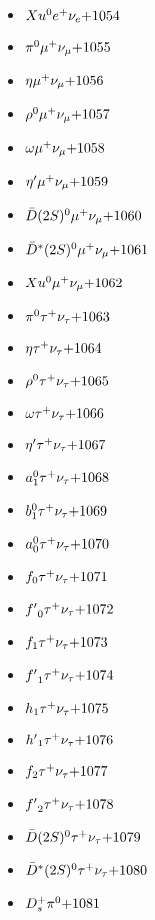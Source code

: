 \begin{multicols}{3}
\begin{itemize}
 \item $ Xu^{0} e^{+} \nu_{e} \hfill{+1054}$
 \item $ \pi^{0} \mu^{+} \nu_{\mu} \hfill{+1055}$
 \item $ \eta \mu^{+} \nu_{\mu} \hfill{+1056}$
 \item $ \rho^{0} \mu^{+} \nu_{\mu} \hfill{+1057}$
 \item $ \omega \mu^{+} \nu_{\mu} \hfill{+1058}$
 \item $ {\eta^{\prime}} \mu^{+} \nu_{\mu} \hfill{+1059}$
 \item $ \bar{D}(2S)^{0} \mu^{+} \nu_{\mu} \hfill{+1060}$
 \item $ \bar{D}^{*}(2S)^{0} \mu^{+} \nu_{\mu} \hfill{+1061}$
 \item $ Xu^{0} \mu^{+} \nu_{\mu} \hfill{+1062}$
 \item $ \pi^{0} \tau^{+} \nu_{\tau} \hfill{+1063}$
 \item $ \eta \tau^{+} \nu_{\tau} \hfill{+1064}$
 \item $ \rho^{0} \tau^{+} \nu_{\tau} \hfill{+1065}$
 \item $ \omega \tau^{+} \nu_{\tau} \hfill{+1066}$
 \item $ {\eta^{\prime}} \tau^{+} \nu_{\tau} \hfill{+1067}$
 \item $ a_{1}^{0} \tau^{+} \nu_{\tau} \hfill{+1068}$
 \item $ b_{1}^{0} \tau^{+} \nu_{\tau} \hfill{+1069}$
 \item $ a_{0}^{0} \tau^{+} \nu_{\tau} \hfill{+1070}$
 \item $ f_{0} \tau^{+} \nu_{\tau} \hfill{+1071}$
 \item $ {f^{\prime}}_{0} \tau^{+} \nu_{\tau} \hfill{+1072}$
 \item $ f_{1} \tau^{+} \nu_{\tau} \hfill{+1073}$
 \item $ {f^{\prime}}_{1} \tau^{+} \nu_{\tau} \hfill{+1074}$
 \item $ h_{1} \tau^{+} \nu_{\tau} \hfill{+1075}$
 \item $ {h^{\prime}}_{1} \tau^{+} \nu_{\tau} \hfill{+1076}$
 \item $ f_{2} \tau^{+} \nu_{\tau} \hfill{+1077}$
 \item $ {f^{\prime}}_{2} \tau^{+} \nu_{\tau} \hfill{+1078}$
 \item $ \bar{D}(2S)^{0} \tau^{+} \nu_{\tau} \hfill{+1079}$
 \item $ \bar{D}^{*}(2S)^{0} \tau^{+} \nu_{\tau} \hfill{+1080}$
 \item $ D_{s}^{+} \pi^{0} \hfill{+1081}$

\end{itemize}
\end{multicols}
